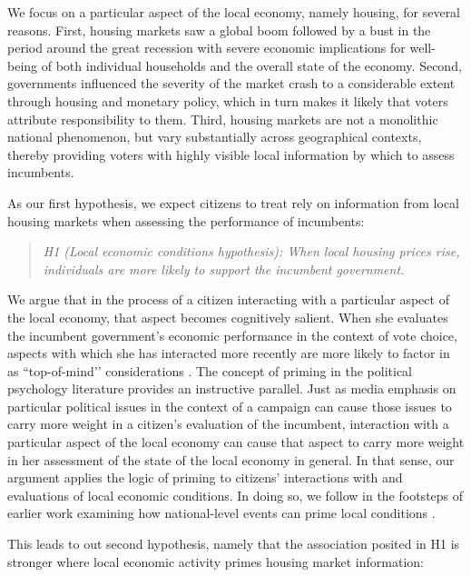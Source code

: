 \documentclass[12pt,a4paper]{article}
\begin{document}
	We focus on a particular aspect of the local economy, namely housing, for several reasons. First, housing markets saw a global boom followed by a bust in the period around the great recession with severe economic implications for well-being of both individual households and the overall state of the economy. Second, governments influenced the severity of the market crash to a considerable extent through housing and monetary policy, which in turn makes it likely that voters attribute responsibility to them. Third, housing markets are not a monolithic national phenomenon, but vary substantially across geographical contexts, thereby providing voters with highly visible local information by which to assess incumbents. 
	
	As our first hypothesis, we expect citizens to treat rely on information from local housing markets when assessing the performance of incumbents: 
	
	\newcommand{\hone}{the local economic conditions hypothesis}
	
	\begin{quote}
		\textit{H1 (Local economic conditions hypothesis): When local housing prices rise, individuals are more likely to support the incumbent government.}
	\end{quote}
	
	We argue that in the process of a citizen interacting with a particular aspect of the local economy, that aspect becomes cognitively salient. When she evaluates the incumbent government’s economic performance in the context of vote choice, aspects with which she has interacted more recently are more likely to factor in as ``top-of-mind’’ considerations \citep{zaller1992nature}. The concept of priming in the political psychology literature provides an instructive parallel. Just as media emphasis on particular political issues in the context of a campaign can cause those issues to carry more weight in a citizen’s evaluation of the incumbent, interaction with a particular aspect of the local economy can cause that aspect to carry more weight in her assessment of the state of the local economy in general. In that sense, our argument applies the logic of priming to citizens’ interactions with and evaluations of local economic conditions. In doing so, we follow in the footsteps of earlier work examining how national-level events can prime local conditions \citep[e.g.,] []{hopkins2010politicized,legewie2013terrorist}. 
	
	This leads to out second hypothesis, namely that the association posited in H1 is stronger where local economic activity primes housing market information:
	
\end{document}
